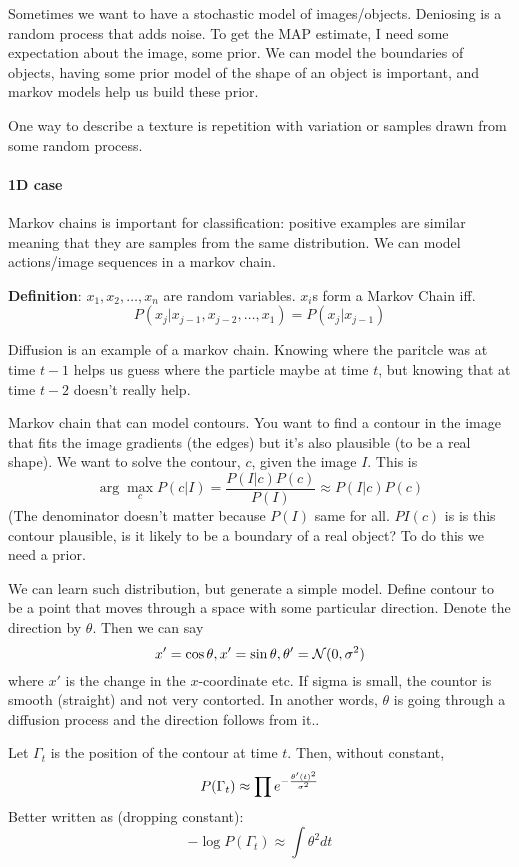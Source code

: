 Sometimes we want to have a stochastic model of
images/objects. Deniosing is a random process that adds noise. To get
the MAP estimate, I need some expectation about the image, some
prior. We can model the boundaries of objects, having some prior model
of the shape of an object is important, and markov models help us
build these prior.

One way to describe a texture is repetition with variation or samples
drawn from some random process. 


\paragraph{1D case}
\label{sec:1d-case}
Markov chains is important for classification: positive examples are
similar meaning that they are samples from the same distribution. We
can model actions/image sequences in a markov chain.

\textbf{Definition}: $x_1, x_2, \dots, x_n$ are random variables. $x_i$s form a Markov
Chain iff. $$P(x_j | x_{j-1}, x_{j-2}, \dots,x_1) = P(x_j | x_{j-1})$$

Diffusion is an example of a  markov chain. Knowing where the paritcle
was at time $t-1$ helps us guess where the particle maybe at time $t$,
but knowing that at time $t-2$ doesn't really help. 

Markov chain that can model contours. You want to find a contour in
the image that fits the image gradients (the edges) but it's also
plausible (to be a real shape).  We want to solve the contour, $c$,
given the image $I$. This is $$\arg\max_c P(c|I) =
\frac{P(I|c)P(c)}{P(I)} \approx P(I|c)P(c)$$ (The denominator doesn't
matter because $P(I)$ same for all. $PI(c)$ is is this contour
plausible, is it likely to be a boundary of a real object? To do this
we need a prior. 

We can learn such distribution, but generate a simple model. Define contour to be
a point that moves through a space with some particular
direction. Denote the direction by $\theta$. Then we can say 
$$x' =\cos \theta, x'=\sin \theta, \theta' = \mathcal{N}(0, \sigma^2)$$
where $x'$ is the change in the $x$-coordinate etc. If sigma is small,
the countor is smooth (straight) and not very contorted. In another words, $\theta$ is going
through a diffusion process and the direction follows from it..

Let $\Gamma_t$ is the position of the contour at time $t$. Then,
without constant, 
$$P(\Gamma_t)\approx \prod e^{-\frac{\theta'(t)^2}{\sigma^2}}$$
Better written as (dropping constant):
\begin{equation}
  \label{eq:26}
-\log P(\Gamma_t)\approx \int \theta^2dt
\end{equation}

